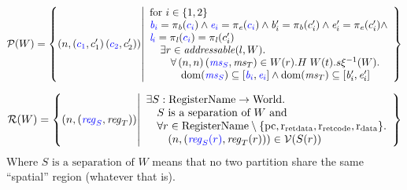 \documentclass[a3paper]{article}
\newcommand{\dom}{\mathrm{dom}}
\newcommand{\npair}[2][n]{\left(#1,#2\right)}
\newcommand{\fun}{\rightarrow}
\newcommand{\tand}{\text{ and }}
\newcommand{\typesetlr}[1]{\mathcal{#1}}
\newcommand{\lrr}{\typesetlr{R}}
\newcommand{\lrv}{\typesetlr{V}}
\newcommand{\lrp}{\typesetlr{P}}
\newcommand{\stpair}[3][]{
\ifthenelse{\equal{#1}{}}
{\left(\src{#2_S},#3_T\right)}
{\left(\src{#2},#3\right)}}
\newcommand{\World}{\mathrm{World}}
\newcommand{\sourcecolor}{\color{blue}}
\newcommand{\src}[1]{{\sourcecolor #1}}
\newcommand{\shareddom}[1]{\mathrm{#1}}
\newcommand{\RegName}{\shareddom{RegisterName}}
\newcommand{\lin}{\var{l}}
\newcommand{\var}[1]{\mathit{#1}}
\newcommand{\reg}{\var{reg}}
\newcommand{\ms}{\var{ms}}
\newcommand{\baddr}{\var{b}}
\newcommand{\eaddr}{\var{e}}
\newcommand{\pcreg}{\mathrm{pc}}
\newcommand{\rretc}{\mathrm{r}_\mathrm{ret code}}
\newcommand{\rretd}{\mathrm{r}_\mathrm{ret data}}
\newcommand{\rdata}{\mathrm{r}_\mathrm{data}}
\newcommand{\plainfun}[2]{
  \ifthenelse{\equal{#2}{}}
  {\mathit{#1}}
  {\mathit{#1}(#2)}
}
\newcommand{\addressable}[1]{\plainfun{addressable}{#1}}
\begin{document}
\[
  \lrp(W) = \left\{
    \npair{\stpair[.]{c_1}{c_1'}\stpair[.]{c_2}{c_2'}} \middle| 
    \begin{array}{l}
      \text{for $i \in \{1,2\}$} \\
      \src{\baddr_i} = \pi_\baddr(\src{c_i}) \wedge \src{\eaddr_i} = \pi_\eaddr(\src{c_i}) \wedge 
      \baddr_i' = \pi_\baddr(c_i') \wedge \eaddr_i' = \pi_\eaddr(c_i') \wedge \\
      \src{\lin_i} = \pi_\lin(\src{c_i}) = \pi_\lin(c_i') \\
      \quad \exists r \in \addressable{l,W} \ldotp\\
      \qquad \forall \npair{n}{\stpair{\ms}{\ms}} \in W(r).H \; W(t).s \xi^{-1}(W)  \ldotp \\
      \qquad \quad \dom(\src{\ms_S}) \subseteq [\src{\baddr_i},\src{\eaddr_i}] \wedge \dom(\ms_T) \subseteq [\baddr_i',\eaddr_i']      
    \end{array}
  \right\}
\]


\[
  \lrr(W) = \left\{ \npair{\stpair{\reg}{\reg}} \middle|
    \begin{array}{l}
      \exists S : \RegName \fun \World \ldotp \\
      \quad S \text{ is a separation of $W$} \tand\\
      \quad \forall r \in \RegName \setminus \{\pcreg, \rretd,\rretc,\rdata \}\ldotp\\
      \qquad\npair{\stpair[.]{\src{\reg_S(r)}}{\reg_T(r)}} \in \lrv(S(r))
    \end{array}
            \right\}
\]
Where $S\text{ is a separation of $W$}$ means that no two partition share the same ``spatial'' region (whatever that is).
\end{document}
